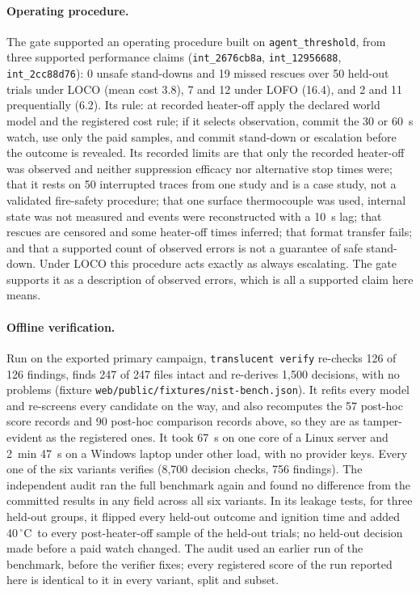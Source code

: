 \documentclass[11pt]{article}
\newcommand{\cmd}[1]{\texttt{#1}}
\newcommand{\degC}{\,$^\circ$C}
\begin{document}
\paragraph{Operating procedure.} The gate supported an operating procedure built on \texttt{agent\_threshold}, from
three supported performance claims (\texttt{int\_2676cb8a}, \texttt{int\_12956688}, \texttt{int\_2cc88d76}): 0 unsafe
stand-downs and 19 missed rescues over 50 held-out trials under LOCO (mean cost 3.8), 7 and 12 under LOFO (16.4), and
2 and 11 prequentially (6.2). Its rule: at recorded heater-off apply the declared world model and the registered cost
rule; if it selects observation, commit the 30 or 60~s watch, use only the paid samples, and commit stand-down or
escalation before the outcome is revealed. Its recorded limits are that only the recorded heater-off was observed and
neither suppression efficacy nor alternative stop times were; that it rests on 50 interrupted traces from one study
and is a case study, not a validated fire-safety procedure; that one surface thermocouple was used, internal state was
not measured and events were reconstructed with a 10~s lag; that rescues are censored and some heater-off times
inferred; that format transfer fails; and that a supported count of observed errors is not a guarantee of safe
stand-down. Under LOCO this procedure acts exactly as always escalating. The gate supports it as a description of
observed errors, which is all a supported claim here means.

\paragraph{Offline verification.} Run on the exported primary campaign, \cmd{translucent verify}
re-checks 126 of 126 findings, finds 247 of 247 files intact and
re-derives 1{,}500 decisions, with no problems
(fixture \cmd{web/public/fixtures/nist-bench.json}). It refits every model and re-screens every candidate on the way,
and also recomputes the 57 post-hoc score records and 90 post-hoc comparison records above, so they are as
tamper-evident as the registered ones. It took 67~s on one core of a Linux server and 2~min 47~s on a Windows laptop
under other load, with no provider keys. Every one of the six variants verifies (8{,}700 decision checks, 756
findings). The independent audit ran the full benchmark again and found no difference from the
committed results in any field across all six variants. In its leakage tests, for three held-out groups, it flipped every
held-out outcome and ignition time and added 40\degC\ to every post-heater-off sample of the held-out trials; no
held-out decision made before a paid watch changed. The audit used an earlier run of the benchmark, before the verifier fixes; every registered score of the run
reported here is identical to it in every variant, split and subset.
\end{document}
